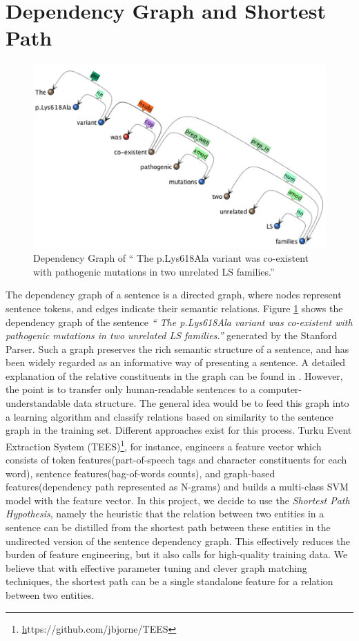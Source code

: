 \section{Dependency Graph and Shortest Path}
	\begin{figure}[h]
		\centering
			\includegraphics[width=\textwidth]{Dependency_Graph}
			\caption{Dependency Graph of `` The p.Lys618Ala variant was co-existent with pathogenic mutations in two unrelated LS families.''}
			\label{fig:Dependency_Graph}   
	\end{figure}
The dependency graph of a sentence is a directed graph, where nodes represent sentence tokens, and edges indicate their semantic relations. Figure \ref{fig:Dependency_Graph} shows the dependency graph of the sentence \emph{`` The p.Lys618Ala variant was co-existent with pathogenic mutations in two unrelated LS families.''} generated by the Stanford Parser. Such a graph preserves the rich semantic structure of a sentence, and has been widely regarded as an informative way of presenting a sentence. A detailed explanation of the relative constituents in the graph can be found in \cite{de2008stanford}. However, the point is to transfer only human-readable sentences to a computer-understandable data structure. The general idea would be to feed this graph into a learning algorithm and classify relations based on similarity to the sentence graph in the training set. Different approaches exist for this process. Turku Event Extraction System (TEES)\footnote{\href{https://github.com/jbjorne/TEES}https://github.com/jbjorne/TEES}, for instance, engineers a feature vector which consists of token features(part-of-speech tags and character constituents for each word), sentence features(bag-of-words counts), and graph-based features(dependency path represented as N-grams) and builds a multi-class SVM model with the feature vector\cite{bjorne2011generalizing}. In this project, we decide to use the \emph{Shortest Path Hypothesis}\cite{bunescu2005shortest}, namely the heuristic that the relation between two entities in a sentence can be distilled from the shortest path between these entities in the undirected version of the sentence dependency graph. This effectively reduces the burden of feature engineering\cite{liu2013approximate}, but it also calls for high-quality training data. We believe that with effective parameter tuning and clever graph matching techniques, the shortest path can be a single standalone feature for a relation between two entities.
